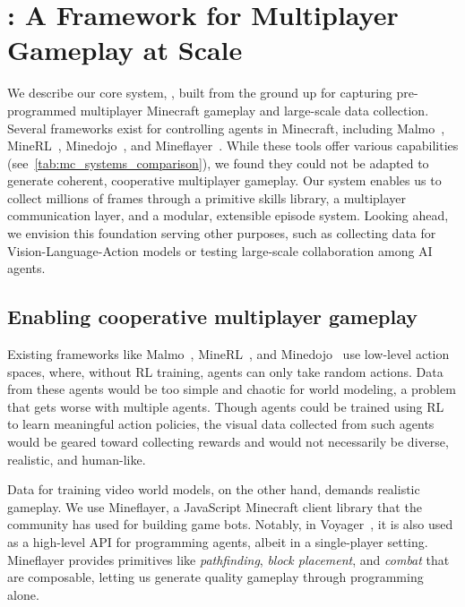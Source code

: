 
\section{\solarisengine: A Framework for Multiplayer Gameplay at Scale}
\label{sec:system}






We describe our core system, \solarisengine, built from the ground up for capturing pre-programmed multiplayer Minecraft gameplay and large-scale data collection. Several frameworks exist for controlling agents in Minecraft, including Malmo~\cite{johnson2016malmo}, MineRL~\cite{guss2019minerllargescaledatasetminecraft}, Minedojo~\cite{fan2022minedojo}, and Mineflayer~\cite{mineflayer2025}. While these tools offer various capabilities (see~\cref{tab:mc_systems_comparison}), we found they could not be adapted to generate coherent, cooperative multiplayer gameplay. Our system enables us to collect millions of frames through a primitive skills library, a multiplayer communication layer, and a modular, extensible episode system. Looking ahead, we envision this foundation serving other purposes, such as collecting data for Vision-Language-Action models or testing large-scale collaboration among AI agents.




\subsection{Enabling cooperative multiplayer gameplay} Existing frameworks like Malmo~\cite{johnson2016malmo}, MineRL~\cite{guss2019minerllargescaledatasetminecraft}, and Minedojo~\cite{fan2022minedojo} use low-level action spaces, where, without RL training, agents can only take random actions. Data from these agents would be too simple and chaotic for world modeling, a problem that gets worse with multiple agents. Though agents could be trained using RL to learn meaningful action policies, the visual data collected from such agents would be geared toward collecting rewards and would not necessarily be diverse, realistic, and human-like.

Data for training video world models, on the other hand, demands realistic gameplay. We use Mineflayer, a JavaScript Minecraft client library that the community has used for building game bots. Notably, in Voyager~\cite{wang2023voyager}, it is also used as a high-level API for programming agents, albeit in a single-player setting. Mineflayer provides primitives like \textit{pathfinding}, \textit{block placement}, and \textit{combat} that are composable, letting us generate quality gameplay through programming alone.

